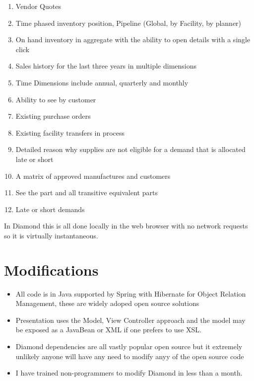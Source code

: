 \documentclass[letterpaper,10pt,english]{sphinxmanual}
\begin{document}
\begin{enumerate}
\item {} 
Vendor Quotes

\item {} 
Time phased inventory position, Pipeline (Global, by Facility, by
planner)

\item {} 
On hand inventory in aggregate with the ability to open details with
a single click

\item {} 
Sales history for the last three years in multiple dimensions

\item {} 
Time Dimensions include annual, quarterly and monthly

\item {} 
Ability to see by customer

\item {} 
Existing purchase orders

\item {} 
Existing facility transfers in process

\item {} 
Detailed reason why supplies are not eligible for a demand that is
allocated late or short

\item {} 
A matrix of approved manufactures and customers

\item {} 
See the part and all transitive equivalent parts

\item {} 
Late or short demands

\end{enumerate}

In Diamond this is all done locally in the web browser with no network
requests so it is virtually instantaneous.


\chapter{Modifications}
\label{FutureState:modifications}\begin{itemize}
\item {} 
All code is in Java supported by Spring with Hibernate for Object
Relation Management, these are widely adoped open source solutions

\item {} 
Presentation uses the Model, View Controller approach and the model
may be exposed as a JavaBean or XML if one prefers to use XSL.

\item {} 
Diamond dependencies are all vastly popular open source but it
extremely unlikely anyone will have any need to modify anyy of the
open source code

\item {} 
I have trained non-programmers to modify Diamond in less than a
month.

\end{itemize}
\end{document}
